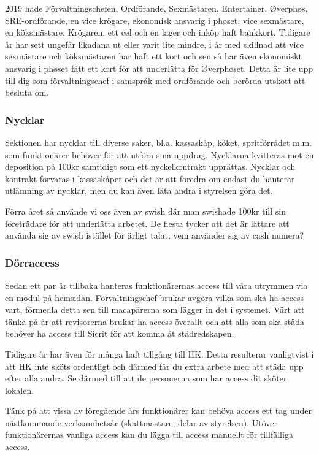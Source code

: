 \documentclass[10pt]{article}
\begin{document}
2019 hade Förvaltningschefen, Ordförande, Sexmästaren, Entertainer, Øverphøs, SRE-ordförande, en vice krögare, ekonomisk ansvarig i phøset, vice sexmästare, en köksmästare, Krögaren, ett cøl och en lager och inköp haft bankkort. 
Tidigare år har sett ungefär likadana ut eller varit lite mindre, i år med skillnad att vice sexmästare och köksmästaren har haft ett kort och sen så har även ekonomiskt ansvarig i phøset fått ett kort för att underlätta för Øverphøset. Detta är lite upp till dig som förvaltningschef i samspråk med ordförande och berörda utskott att besluta om. 

\subsubsection{Nycklar}
Sektionen har nycklar till diverse saker, bl.a. kassaskåp, köket, spritförrådet m.m. som funktionärer behöver för att utföra sina uppdrag. Nycklarna kvitteras mot en deposition på 100kr samtidigt som ett nyckelkontrakt upprättas. Nycklar och kontrakt förvaras i kassaskåpet och det är att föredra om endast du hanterar utlämning av nycklar, men du kan även låta andra i styrelsen göra det.

Förra året så använde vi oss även av swish där man swishade 100kr till sin företrädare för att underlätta arbetet. De flesta tycker att det är lättare att använda sig av swish istället för ärligt talat, vem använder sig av cash numera?

\subsubsection{Dörraccess}
Sedan ett par år tillbaka hanteras funktionärernas access till våra utrymmen via en modul på hemsidan. Förvaltningschef brukar avgöra vilka som ska ha access vart, förmedla detta sen till macapärerna som lägger in det i systemet. Värt att tänka på är att revisorerna brukar ha access överallt och att alla som ska städa behöver ha access till Sicrit för att komma åt städredskapen. 

Tidigare år har även för många haft tillgång till HK. Detta resulterar vanligtvist i att HK inte sköts ordentligt och därmed får du extra arbete med att städa upp efter alla andra. Se därmed till att de personerna som har access dit sköter lokalen.

Tänk på att vissa av föregående års funktionärer kan behöva access ett tag under nästkommande verksamhetsår (skattmästare, delar av styrelsen). Utöver funktionärernas vanliga access kan du lägga till access manuellt för tillfälliga access. 
\end{document}
